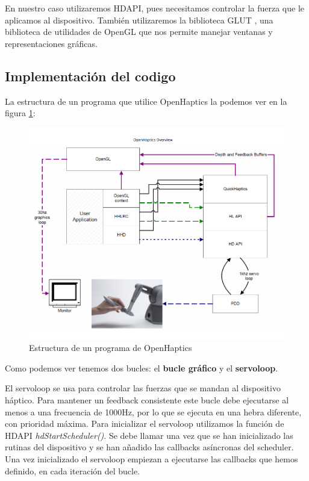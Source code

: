 \documentclass[a4paper,11pt, oneside]{book}
\begin{document}
En nuestro caso utilizaremos HDAPI, pues necesitamos controlar la fuerza que le aplicamos al dispositivo. También utilizaremos la biblioteca GLUT \cite{glut}, una biblioteca de utilidades de OpenGL que nos permite manejar ventanas y representaciones gráficas.

\subsection{Implementación del codigo}

La estructura de un programa que utilice OpenHaptics la podemos ver en la figura \ref{fig:oh-estructura}: 

\begin{figure}[H]
	
	\centering
	\includegraphics[width=\linewidth]{estructura}
	\caption{Estructura de un programa de OpenHaptics \cite{guide}}
	\label{fig:oh-estructura}
	
\end{figure}


Como podemos ver tenemos dos bucles: el \textbf{bucle gráfico} y el \textbf{servoloop}.

El servoloop se usa para controlar las fuerzas que se mandan al dispositivo háptico. Para mantener un feedback consistente este bucle debe ejecutarse al menos a una frecuencia de 1000Hz, por lo que se ejecuta en una hebra diferente, con prioridad máxima. Para inicializar el servoloop utilizamos la función de HDAPI \textit{hdStartScheduler()}. Se debe llamar una vez que se han inicializado las rutinas del dispositivo y se han añadido las callbacks asíncronas del scheduler. Una vez inicializado el servoloop empiezan a ejecutarse las callbacks que hemos definido, en cada iteración del bucle.
\end{document}
